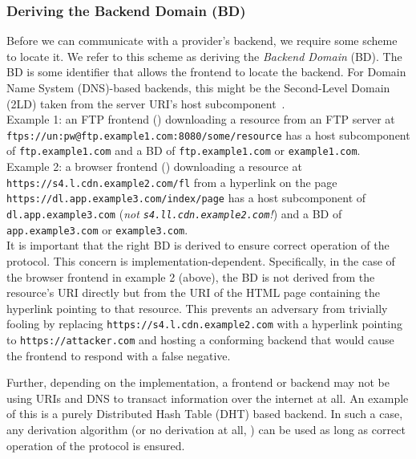 \subsubsection{Deriving the Backend Domain (BD)}

Before we can communicate with a provider's backend, we require some scheme to
locate it. We refer to this scheme as deriving the \emph{Backend Domain} (BD).
The BD is some identifier that allows the frontend to locate the backend. For
Domain Name System (DNS)-based backends, this might be the Second-Level Domain
(2LD) taken from the server URI's host subcomponent~\cite{RFC3986}. \\

Example 1: an FTP frontend () downloading a
resource from an FTP server at
\texttt{ftps://un:pw@ftp.example1.com:8080/some/resource} has a host
subcomponent of \texttt{ftp.example1.com} and a BD of \texttt{ftp.example1.com}
or \texttt{example1.com}. \\

Example 2: a browser frontend ()
downloading a resource at \texttt{https://s4.l.cdn.example2.com/fl} from a
hyperlink on the page \texttt{https://dl.app.example3.com/index/page} has a host
subcomponent of \texttt{dl.app.example3.com} (\emph{not
\texttt{s4.ll.cdn.example2.com}!}) and a BD of \texttt{app.example3.com} or
\texttt{example3.com}. \\

It is important that the right BD is derived to ensure correct operation of the
protocol. This concern is implementation-dependent. Specifically, in the case of
the browser frontend in example 2 (above), the BD is not derived from the
resource's URI directly but from the URI of the HTML page containing the
hyperlink pointing to that resource. This prevents an adversary from trivially
fooling \SYSTEM{} by replacing \texttt{https://s4.l.cdn.example2.com} with a
hyperlink pointing to \texttt{https://attacker.com} and hosting a conforming
\SYSTEM{} backend that would cause the frontend to respond with a false
negative.

Further, depending on the implementation, a frontend or backend may not be using
URIs and DNS to transact information over the internet at all. An example of
this is a purely Distributed Hash Table (DHT) based backend. In such a case, any
derivation algorithm (or no derivation at all, ) can be
used as long as correct operation of the protocol is ensured.

